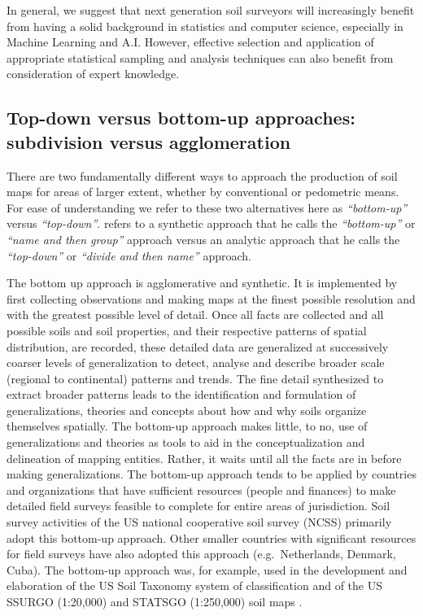 \documentclass[graybox,natbib,nospthms,UStrade]{svmono}
\begin{document}
In general, we suggest that next generation soil surveyors will
increasingly benefit from having a solid background in statistics and computer
science, especially in Machine Learning and A.I. However, effective selection and application of
appropriate statistical sampling and analysis techniques can also benefit from
consideration of expert knowledge.

\hypertarget{top-down}{%
\subsection{Top-down versus bottom-up approaches: subdivision versus agglomeration}\label{top-down}}

There are two fundamentally different ways to approach the production of
soil maps for areas of larger extent, whether by conventional or
pedometric means. For ease of understanding we refer to these two
alternatives here as \emph{``bottom-up''} versus \emph{``top-down''}. \citet{Rossiter2001}
refers to a synthetic approach that he calls the \emph{``bottom-up''} or \emph{``name
and then group''} approach versus an analytic approach that he calls the
\emph{``top-down''} or \emph{``divide and then name''} approach.

The bottom up approach is agglomerative and synthetic. It is implemented
by first collecting observations and making maps at the finest possible
resolution and with the greatest possible level of detail. Once all
facts are collected and all possible soils and soil properties, and
their respective patterns of spatial distribution, are recorded, these
detailed data are generalized at successively coarser levels of
generalization to detect, analyse and describe broader scale (regional
to continental) patterns and trends. The fine detail synthesized to
extract broader patterns leads to the identification and formulation of
generalizations, theories and concepts about how and why soils organize
themselves spatially. The bottom-up approach makes little, to no, use of
generalizations and theories as tools to aid in the conceptualization
and delineation of mapping entities. Rather, it waits until all the
facts are in before making generalizations. The bottom-up approach tends
to be applied by countries and organizations that have sufficient
resources (people and finances) to make detailed field surveys feasible
to complete for entire areas of jurisdiction. Soil survey activities of
the US national cooperative soil survey (NCSS) primarily adopt this
bottom-up approach. Other smaller countries with significant resources
for field surveys have also adopted this approach (e.g.~Netherlands,
Denmark, Cuba). The bottom-up approach was, for example, used in the
development and elaboration of the US Soil Taxonomy system of
classification and of the US SSURGO (1:20,000) and STATSGO (1:250,000)
soil maps \citep{ZHONG2011491}.
\end{document}
